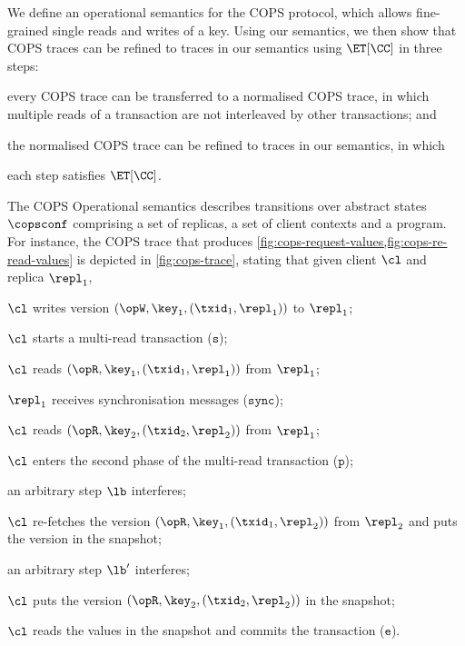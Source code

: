 We define an operational semantics for the COPS protocol, which allows fine-grained single reads and writes of a key.
Using our semantics, we then show that COPS traces can be refined to traces in our semantics using \( \ET[\CC] \) in three steps:
\begin{enumerate*}
\item every COPS trace can be transferred to a normalised COPS trace, 
in which multiple reads of a transaction are not interleaved by other transactions; and
\item the normalised COPS trace can be refined to traces in our semantics, in which \item each step satisfies \( \ET[\CC] \).
\end{enumerate*}

The COPS Operational semantics
describes transitions over abstract states \( \copsconf \) comprising a set of replicas,
a set of client contexts and a program.
For instance, the COPS trace that produces \cref{fig:cops-request-values,fig:cops-re-read-values} is depicted in \cref{fig:cops-trace}, stating that
given client \(\cl\) and replica \( \repl_1 \),
\begin{enumerate*}
\item \( \cl \) writes version \( (\opW,\key_1, (\txid_1,\repl_1)) \) to $\repl_1$;
\item \( \cl \) starts a multi-read transaction (\( \mathtt{s} \));
\item \( \cl \) reads \( (\opR,\key_1, (\txid_1,\repl_1)) \) from $\repl_1$;
\item \( \repl_1 \) receives synchronisation messages (\(\mathtt{sync}\));
\item \( \cl \) reads \( (\opR,\key_2, (\txid_2,\repl_2)) \) from $\repl_1$;
\item \( \cl \) enters the second phase of the multi-read transaction (\(\mathtt{p}\));
\item an arbitrary step \( \lb \) interferes;
\item \( \cl \) re-fetches the version \( (\opR,\key_1, (\txid_1,\repl_2)) \) from \( \repl_2 \) and puts the version in the snapshot;
\item an arbitrary step \( \lb' \) interferes;
\item \( \cl \) puts the version \( (\opR,\key_2, (\txid_2,\repl_2)) \) in the snapshot;
\item \( \cl \) reads the values in the snapshot and commits the transaction (\(\mathtt{e}\)).
\end{enumerate*}

